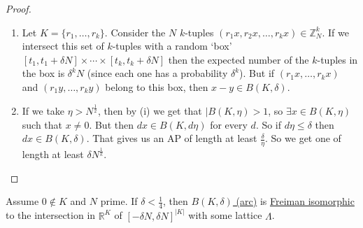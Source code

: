\documentclass{article}
\newcommand{\1}[1]{\mathbbm{1}_{#1}}
\begin{document}
\begin{proof}\leavevmode
  \begin{enumerate}[label=(\roman*)]
    \item Let $K = \{r_1, \dotsc, r_k\}$. Consider the $N$ $k$-tuples $(r_1 x, r_2 x, \dotsc, r_k x) \in \mathbb{Z}_N^k$.
      If we intersect this set of $k$-tuples with a random `box' $[t_1, t_1 + \delta N] \times \dotsm \times [t_k, t_k + \delta N]$
      then the expected number of the $k$-tuples in the box is $\delta^k N$ (since each one has a probability $\delta^k$).
      But if $(r_1 x, \dotsc, r_k x)$ and $(r_1 y, \dotsc, r_k y)$ belong to this box, then $x - y \in B(K, \delta)$.
    \item If we take $\eta > N^{\frac{1}{2}}$, then by (i) we get that $|B(K, \eta) > 1$, so $\exists x \in B(K, \eta)$ such that $x \neq 0$.
      But then $d x \in B(K, d \eta)$ for every $d$.
      So if $d \eta \leq \delta$ then $d x \in B(K, \delta)$. That gives us an AP of length at least $\frac{\delta}{\eta}$.
      So we get one of length at least $\delta N^\frac{1}{k}$. \qedhere
  \end{enumerate}
\end{proof}
\begin{nlemma}\label{lem:1.9}
  Assume $0 \notin K$ and $N$ prime.
  If $\delta < \frac{1}{4}$, then \hyperlink{def:bohr}{$B(K, \delta)$ (arc)} is \hyperlink{def:fhom}{Freiman isomorphic} to the intersection in $\mathbb{R}^{K}$ of $[-\delta N, \delta N]^{|K|}$ with some lattice $\Lambda$.
\end{nlemma}
\end{document}
